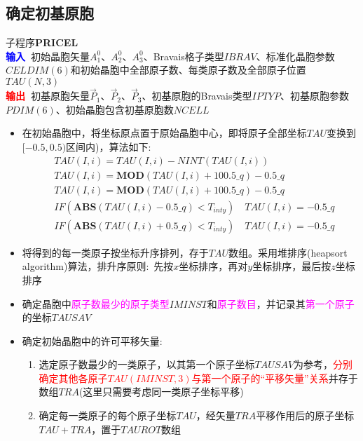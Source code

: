 \documentclass{article}      %
\begin{document}
\subsection{确定初基原胞}
子程序\textbf{PRICEL}\\
\textbf{\textcolor{blue}{输入~}}初始晶胞矢量$A^0_1$、$A^0_2$、$A^0_3$、\textrm{Bravais}格子类型$\mathit{IBRAV}$、标准化晶胞参数$\mathit{CELDIM}(6)$和初始晶胞中全部原子数、每类原子数及全部原子位置$\mathit{TAU}(N,3)$\\
\textbf{\textcolor{red}{输出~}}初基原胞矢量$\vec P_1$、$\vec P_2$、$\vec P_3$、初基原胞的\textrm{Bravais}类型$\mathit{IPTYP}$、初基原胞参数$\mathit{PDIM}(6)$、初始晶胞包含初基原胞数$\mathit{NCELL}$
\begin{itemize}
	\item 在初始晶胞中，将坐标原点置于原始晶胞中心，即将原子全部坐标$\mathit{TAU}$变换到$[-0.5,0.5)$区间内)，算法如下:
			\begin{displaymath}
				\begin{aligned}
					&TAU(I,i)=TAU(I,i)-NINT(TAU(I,i)) \\
					&TAU(I,i)=\mathbf{MOD}(TAU(I,i)+100.5\_q)-0.5\_q \\
					&TAU(I,i)=\mathbf{MOD}(TAU(I,i)+100.5\_q)-0.5\_q \\
					&IF (\mathbf{ABS}(TAU(I,i)-0.5\_q)<T_{inty})\quad TAU(I,i)=-0.5\_q \\
					&IF (\mathbf{ABS}(TAU(I,i)+0.5\_q)<T_{inty})\quad TAU(I,i)=-0.5\_q
				\end{aligned}
			\end{displaymath}
	\item 将得到的每一类原子按坐标升序排列，存于$\mathit{TAU}$数组。采用堆排序\textrm{(heapsort algorithm)}算法，排升序原则:~先按$x$坐标排序，再对$y$坐标排序，最后按$z$坐标排序
	\item 确定晶胞中\textcolor{magenta}{原子数最少的原子类型}$\mathit{IMINST}$和\textcolor{magenta}{原子数目}，并记录其\textcolor{magenta}{第一个原子}的坐标$\mathit{TAUSAV}$
	\item 确定初始晶胞中的许可平移矢量:~
		\begin{enumerate}
			\item 选定原子数最少的一类原子，以其第一个原子坐标$\mathit{TAUSAV}$为参考，\textcolor{red}{分别确定其他各原子$\mathit{TAU}(IMINST,3)$与第一个原子的“平移矢量”关系}并存于数组$\mathit{TRA}$(这里只需要考虑同一类原子坐标平移)
			\item 确定每一类原子的每个原子坐标$\mathit{TAU}$，经矢量$\mathit{TRA}$平移作用后的原子坐标$\mathit{TAU}+\mathit{TRA}$，置于$\mathit{TAUROT}$数组

\end{enumerate}
\end{itemize}
\end{document}
